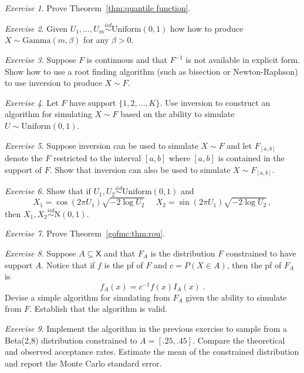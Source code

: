 \documentclass[12pt]{article}
\theoremstyle{plain}
\theoremstyle{definition}
\theoremstyle{remark}
\newtheorem{hw}{Exercise}[section]
\newcommand{\sX}{\mathsf{X}}
\begin{document}
\begin{hw}
  Prove Theorem~\ref{thm:quantile function}.
\end{hw}

\begin{hw} 
Given $U_1, \ldots , U_m \stackrel{iid}{\sim}
  \text{Uniform}(0,1)$ how how to produce $X \sim \text{Gamma}(m,
  \beta)$ for any $\beta > 0$.
\end{hw}

\begin{hw}
Suppose $F$ is continuous and that  $F^{-1}$ is not available in
explicit form. Show how to use a root finding algorithm (such as
bisection or Newton-Raphson) to use inversion to produce $X \sim F$. 
\end{hw}

\begin{hw}
Let $F$ have support $\{1,2,\ldots,K\}$.  Use inversion to construct
an algorithm for simulating $X \sim F$ based on the ability to
simulate $U \sim \text{Uniform}(0,1)$. 
\end{hw}

\begin{hw}
  Suppose inversion can be used to simulate $X \sim F$ and let
  $F_{[a,b]}$ denote the $F$ restricted to the interval $[a,b]$ where
  $[a,b]$ is contained in the support of $F$.  Show that inversion can
  also be used to simulate $X \sim F_{[a,b]}$.
\end{hw}

\begin{hw}
Show that if $U_1 , U_2 \stackrel{iid}{\sim}
  \text{Uniform}(0,1)$ and
\[
X_1 = \cos(2\pi U_1) \sqrt{-2 \log U_2} ~~~~~~ X_2 = \sin(2\pi U_1)
\sqrt{-2 \log U_2}\, ,
\]
then $X_1, X_2 \stackrel{iid}{\sim}\text{N}(0,1)$.
\end{hw}

\begin{hw}
Prove Theorem~\ref{gofmc:thm:rou}.
\end{hw}

\begin{hw}
Suppose $A \subseteq \sX$ and that $F_{A}$ is the distribution $F$
constrained to have support $A$.  Notice that if $f$ is the pf of $F$
and $c= P(X \in A)$, then the pf of $F_{A}$ is
\[
f_{A}(x) = c^{-1} f(x) I_{A}(x) \; .
\]
Devise a simple algorithm for simulating from $F_A$ given the ability
to simulate from $F$.  Establish that the algorithm is valid.  
\end{hw}

\begin{hw}
Implement the algorithm in the previous exercise to sample from a
Beta(2,8) distribution constrained to $A=[.25,.45]$.  Compare the
theoretical and observed acceptance rates. Estimate the mean of the
constrained distribution and report the Monte Carlo standard error. 
\end{hw}
\end{document}
